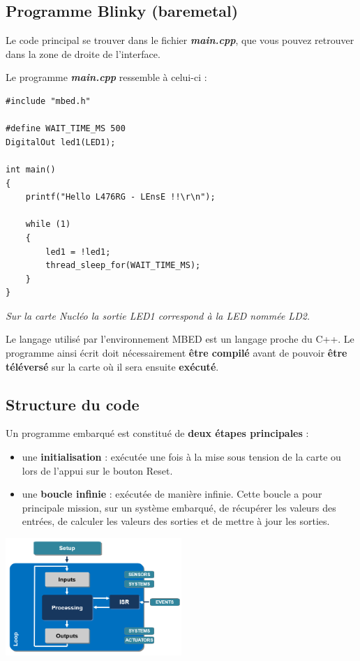 \documentclass[a4paper,11pt,titlepage]{article} %
\begin{document}
\newpage
\subsection{Programme Blinky (baremetal)}

Le code principal se trouver dans le fichier \textsl{\textbf{main.cpp}}, que vous pouvez retrouver dans la zone de droite de l'interface.

Le programme \textsl{\textbf{main.cpp}} ressemble à celui-ci :

\begin{lstlisting}
#include "mbed.h"

#define WAIT_TIME_MS 500 
DigitalOut led1(LED1);

int main()
{
    printf("Hello L476RG - LEnsE !!\r\n");

    while (1)
    {
        led1 = !led1;
        thread_sleep_for(WAIT_TIME_MS);
    }
}

\end{lstlisting}

\textit{Sur la carte Nucléo la sortie LED1 correspond à la LED nommée LD2.}

Le langage utilisé par l'environnement MBED est un langage proche du C++. Le programme ainsi écrit doit nécessairement \textbf{être compilé} avant de pouvoir \textbf{être téléversé} sur la carte où il sera ensuite \textbf{exécuté}.

\subsection{Structure du code}

Un programme embarqué est constitué de \textbf{deux étapes principales} : 

\begin{itemize}
	\item une \textbf{initialisation} : exécutée une fois à la mise sous tension de la carte ou lors de l'appui sur le bouton Reset.
	\item une \textbf{boucle infinie} : exécutée de manière infinie. Cette boucle a pour principale mission, sur un système embarqué, de récupérer les valeurs des entrées, de calculer les valeurs des sorties et de mettre à jour les sorties.
\end{itemize}

\begin{center}
	\includegraphics[width=0.5\textwidth]{images/arduino_program_structure.png}
\end{center}
\end{document}
